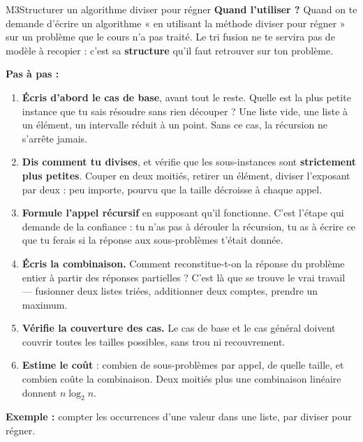 \begin{fichemethode}{M3}{Structurer un algorithme diviser pour régner}
\textbf{Quand l'utiliser ?} Quand on te demande d'écrire un algorithme « en utilisant la
méthode diviser pour régner » sur un problème que le cours n'a pas traité. Le tri fusion ne
te servira pas de modèle à recopier : c'est sa \textbf{structure} qu'il faut retrouver sur
ton problème.

\textbf{Pas à pas :}
\begin{enumerate}
  \item \textbf{Écris d'abord le cas de base}, avant tout le reste. Quelle est la plus petite
    instance que tu sais résoudre sans rien découper ? Une liste vide, une liste à un
    élément, un intervalle réduit à un point. Sans ce cas, la récursion ne s'arrête jamais.
  \item \textbf{Dis comment tu divises}, et vérifie que les sous-instances sont
    \textbf{strictement plus petites}. Couper en deux moitiés, retirer un élément, diviser
    l'exposant par deux : peu importe, pourvu que la taille décroisse à chaque appel.
  \item \textbf{Formule l'appel récursif} en supposant qu'il fonctionne. C'est l'étape qui
    demande de la confiance : tu n'as pas à dérouler la récursion, tu as à écrire ce que tu
    ferais si la réponse aux sous-problèmes t'était donnée.
  \item \textbf{Écris la combinaison.} Comment reconstitue-t-on la réponse du problème entier
    à partir des réponses partielles ? C'est là que se trouve le vrai travail — fusionner deux
    listes triées, additionner deux comptes, prendre un maximum.
  \item \textbf{Vérifie la couverture des cas.} Le cas de base et le cas général doivent
    couvrir toutes les tailles possibles, sans trou ni recouvrement.
  \item \textbf{Estime le coût} : combien de sous-problèmes par appel, de quelle taille, et
    combien coûte la combinaison. Deux moitiés plus une combinaison linéaire donnent
    $n\log_2 n$.
\end{enumerate}

\textbf{Exemple :} compter les occurrences d'une valeur dans une liste, par diviser pour
régner.


\end{fichemethode}
